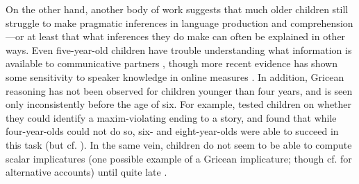 \documentclass[review]{elsarticle}
\begin{document}

On the other hand, another body of work suggests that much older children still struggle to make pragmatic inferences in language production and comprehension---or at least that what inferences they do make can often be explained in other ways. Even five-year-old children have trouble understanding what information is available to communicative partners \citep{glucksberg1966}, though more recent evidence has shown some sensitivity to speaker knowledge in online measures \citep{nadig2002}. In addition, Gricean reasoning has not been observed for children younger than four years, and is seen only inconsistently before the age of six. For example, \citet{conti1984} tested children on whether they could identify a maxim-violating ending to a story, and found that while four-year-olds could not do so, six- and eight-year-olds were able to succeed in this task (but cf. \citealp{eskritt2008}). In the same vein, children do not seem to be able to compute scalar implicatures (one possible example of a Gricean implicature; though cf. \citealp{chierchia2001,gualmini2001,guasti2005} for alternative accounts) until quite late \citep{noveck2001}. 
\end{document}

